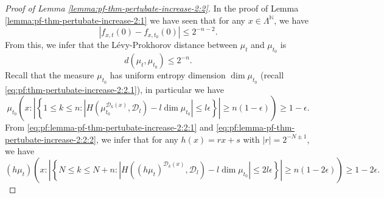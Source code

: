 \documentclass[a4paper,11pt]{amsart}
\theoremstyle{definition}
\numberwithin{equation}{section}
\def\D{\mathcal{D}}
\def\N{\mathbb N}
\begin{document}
\begin{proof}[Proof of Lemma \ref{lemma:pf-thm-pertubate-increase-2:2}]
{\color{black}In the proof of Lemma \ref{lemma:pf-thm-pertubate-increase-2:1} we have seen that for any $x\in \Lambda^\N$,  we have 
\[
|f_{x,t}(0)-f_{x,t_0}(0) |\le 2^{-n-2}.
\] } 
From this, we infer that the L\'evy-Prokhorov distance between $\mu_t$ and $\mu_{t_0}$ is 
\begin{equation}\label{eq:pf:lemma-pf-thm-pertubate-increase-2:2:1}
d(\mu_t,\mu_{t_0}) \le 2^{-n}.
\end{equation}
Recall that the measure $\mu_{t_0}$ has uniform entropy dimension $\dim \mu_{t_0}$ (recall \eqref{eq:pf:thm-pertubate-increase-2:2.1}),  in particular  we have 
\begin{equation}\label{eq:pf:lemma-pf-thm-pertubate-increase-2:2:2}
\mu_{t_0} \left( x:\left| \left\{ 1\le k\le n: \left|H(\mu_{t_0}^{\D_k(x)},\D_l)-l\dim\mu_{t_0}\right| \le l \epsilon \right\} \right| \ge n(1-\epsilon) \right) \ge 1-\epsilon.
\end{equation}
From \eqref{eq:pf:lemma-pf-thm-pertubate-increase-2:2:1} and \eqref{eq:pf:lemma-pf-thm-pertubate-increase-2:2:2},  we infer that for any $h(x)=rx+s$ with $|r| = 2^{-N\pm 1}$, we have 
\begin{equation}\label{eq:pf:lemma-pf-thm-pertubate-increase-2:2:3}
(h\mu_{t}) \left( x:\left| \left\{ N\le k\le N+n: \left|H((h\mu_{t})^{\D_k(x)},\D_l)-l\dim\mu_{t_0}\right| \le 2 l \epsilon \right\} \right| \ge n(1-2\epsilon) \right) \ge 1-2\epsilon.
\end{equation}
 

\end{proof}
\end{document}

